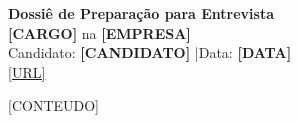 \documentclass[11pt,a4paper]{article}
\begin{document}
\begin{center}
    {\Huge \textbf{\color{primary} Dossiê de Preparação para Entrevista}}\\[6pt]
    {\Large \textbf{[CARGO]} na \textbf{[EMPRESA]}}\\[4pt]
    {\small Candidato: \textbf{[CANDIDATO]} \quad|\quad Data: \textbf{[DATA]}}\\[2pt]
    {\footnotesize \url{[URL]}}
\end{center}

\vspace{1em}

[CONTEUDO]
\end{document}
